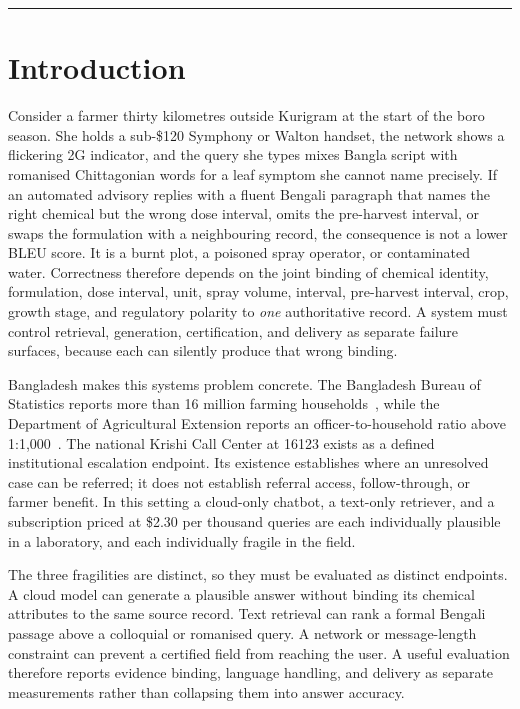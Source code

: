 \documentclass[11pt,a4paper]{article}
\begin{document}
\vspace{0.8em}
\hrule
\vspace{1.2em}


\section{Introduction}
\label{sec:introduction}

Consider a farmer thirty kilometres outside Kurigram at the start of the boro season. She holds a sub-\$120 Symphony or Walton handset, the network shows a flickering 2G indicator, and the query she types mixes Bangla script with romanised Chittagonian words for a leaf symptom she cannot name precisely. If an automated advisory replies with a fluent Bengali paragraph that names the right chemical but the wrong dose interval, omits the pre-harvest interval, or swaps the formulation with a neighbouring record, the consequence is not a lower BLEU score. It is a burnt plot, a poisoned spray operator, or contaminated water. Correctness therefore depends on the joint binding of chemical identity, formulation, dose interval, unit, spray volume, interval, pre-harvest interval, crop, growth stage, and regulatory polarity to \emph{one} authoritative record. A system must control retrieval, generation, certification, and delivery as separate failure surfaces, because each can silently produce that wrong binding.

Bangladesh makes this systems problem concrete. The Bangladesh Bureau of Statistics reports more than 16 million farming households~\cite{bbs2019}, while the Department of Agricultural Extension reports an officer-to-household ratio above 1:1{,}000~\cite{dae2021}. The national Krishi Call Center at 16123 exists as a defined institutional escalation endpoint. Its existence establishes where an unresolved case can be referred; it does not establish referral access, follow-through, or farmer benefit. In this setting a cloud-only chatbot, a text-only retriever, and a subscription priced at \$2.30 per thousand queries are each individually plausible in a laboratory, and each individually fragile in the field.

The three fragilities are distinct, so they must be evaluated as distinct endpoints. A cloud model can generate a plausible answer without binding its chemical attributes to the same source record. Text retrieval can rank a formal Bengali passage above a colloquial or romanised query. A network or message-length constraint can prevent a certified field from reaching the user. A useful evaluation therefore reports evidence binding, language handling, and delivery as separate measurements rather than collapsing them into answer accuracy.
\end{document}
